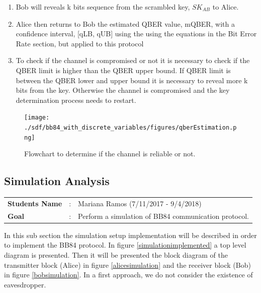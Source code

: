 \begin{refsection}
	\begin{enumerate}
		\item Bob will reveals k bits sequence from the scrambled key, $SK_{AB}$ to Alice.
		\item Alice then returns to Bob the estimated QBER value, mQBER, with a confidence interval, [qLB, qUB] using the using the equations in the Bit Error Rate section, but applied to this protocol
		\item To check if the channel is compromised or not it is necessary to check if the QBER limit is higher than the QBER upper bound. If QBER limit is between the QBER lower and upper bound it is necessary to reveal more k bits from the key. Otherwise the channel is compromised and the key determination process needs to restart.
	\end{enumerate}
	
	
\begin{figure}[H]
	\centering
	\texttt{[image: ./sdf/bb84\_with\_discrete\_variables/figures/qberEstimation.png]}
	\caption{Flowchart to determine if the channel is reliable or not.}\label{fig:flowQber}
\end{figure}



\newpage

\subsection{Simulation Analysis}

\begin{tcolorbox}	
\begin{tabular}{p{2.75cm} p{0.2cm} p{10.5cm}} 	
\textbf{Students Name}  &:& Mariana Ramos (7/11/2017 - 9/4/2018) \\
\textbf{Goal}          &:& Perform a simulation of BB84 communication protocol.
\end{tabular}
\end{tcolorbox}

In this sub section the simulation setup implementation will be described in order to implement the BB84 protocol. In figure \ref{simulationimplemented} a top level diagram is presented. Then it will be presented the block diagram of the transmitter block (Alice) in figure \ref{alicesimulation} and the receiver block (Bob) in figure \ref{bobsimulation}. In a first approach, we do not consider the existence of eavesdropper.


\end{refsection}
